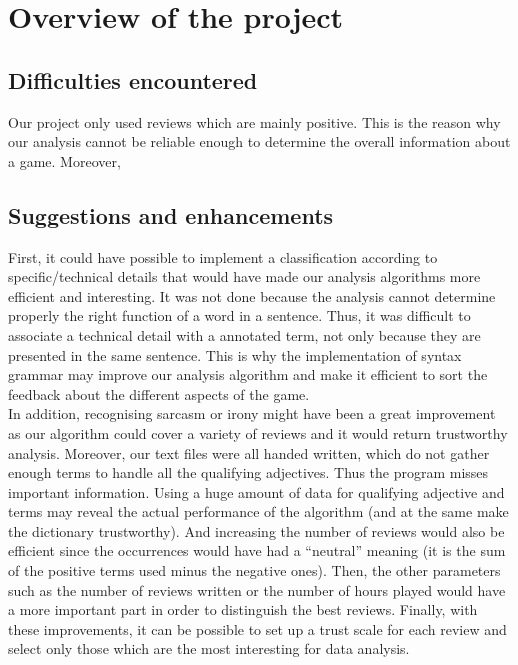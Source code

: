 \documentclass[paper=a4,fontsize=12pt]{report}
\begin{document}
\chapter{Overview of the project}
\section{Difficulties encountered}
Our project only used reviews which are mainly positive. This is the reason why our analysis cannot be reliable enough to determine the overall information about a game. Moreover, 
\section{Suggestions and enhancements}
First, it could have possible to implement a classification according to specific/technical details that would have made our analysis algorithms more efficient and interesting. It was not done because the analysis cannot determine properly the right function of a word in a sentence. Thus, it was difficult to associate a technical detail with a annotated term, not only because they are presented in the same sentence. This is why the implementation of syntax grammar may improve our analysis algorithm and make it efficient to sort the feedback about the different aspects of the game.
\\
\linebreak
In addition, recognising sarcasm or irony might have been a great improvement as our algorithm could cover a variety of reviews and it would return trustworthy analysis. Moreover, our text files were all handed written, which do not gather enough terms to handle all the qualifying adjectives. Thus the program misses important information. Using a huge amount of data for qualifying adjective and terms may reveal the actual performance of the algorithm (and at the same make the dictionary trustworthy). And increasing the number of reviews would also be efficient since the occurrences would have had a "`neutral"' meaning (it is the sum of the positive terms used minus the negative ones). Then, the other parameters such as the number of reviews written or the number of hours played would have a more important part in order to distinguish the best reviews.
\linebreak 
Finally, with these improvements, it can be possible to set up a trust scale for each review and select only those which are the most interesting for data analysis. 
\end{document}
